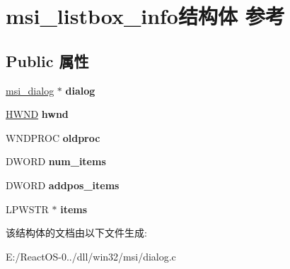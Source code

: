 \hypertarget{structmsi__listbox__info}{}\section{msi\+\_\+listbox\+\_\+info结构体 参考}
\label{structmsi__listbox__info}
\subsection*{Public 属性}
\begin{DoxyCompactItemize}
\item 
\mbox{\label{structmsi__listbox__info_abd5735b1ee3f8122bc133262b5abb772}} 
\hyperlink{structmsi__dialog__tag}{msi\+\_\+dialog} $\ast$ {\bfseries dialog}
\item 
\mbox{\label{structmsi__listbox__info_a55441ba2a134ec1dea69c81a1e17183b}} 
\hyperlink{interfacevoid}{H\+W\+ND} {\bfseries hwnd}
\item 
\mbox{\label{structmsi__listbox__info_af3481e054925cf7793d8f0cc4e2f3931}} 
W\+N\+D\+P\+R\+OC {\bfseries oldproc}
\item 
\mbox{\label{structmsi__listbox__info_aa84a829bfd20010418b087f4142fd5ac}} 
D\+W\+O\+RD {\bfseries num\+\_\+items}
\item 
\mbox{\label{structmsi__listbox__info_adbd29deac5dbff4289d02092b0e26a4b}} 
D\+W\+O\+RD {\bfseries addpos\+\_\+items}
\item 
\mbox{\label{structmsi__listbox__info_a1e97a97f4bc5c2d79caed3e46bd49788}} 
L\+P\+W\+S\+TR $\ast$ {\bfseries items}
\end{DoxyCompactItemize}


该结构体的文档由以下文件生成\+:\begin{DoxyCompactItemize}
\item 
E\+:/\+React\+O\+S-\/0../dll/win32/msi/dialog.\+c\end{DoxyCompactItemize}
